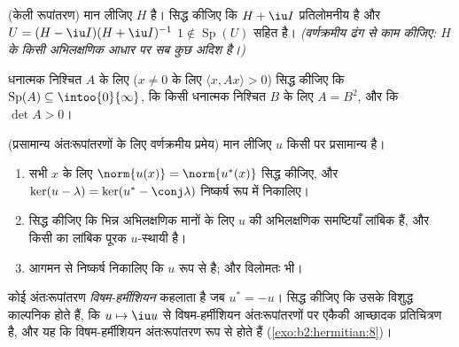 \begin{exercise}[$\star\star$]\label{exo:b2:hermitian:6}
(केली रूपांतरण) मान लीजिए $H$  है। सिद्ध कीजिए कि $H + \iu I$
प्रतिलोमनीय है और $U = (H - \iu I)(H + \iu I)^{-1}$ $1 \notin \operatorname{Sp}(U)$ सहित  है। \emph{(वर्णक्रमीय ढंग से काम
कीजिए: $H$ के किसी अभिलक्षणिक आधार पर सब कुछ अदिश है।)}
\end{exercise}

\begin{exercise}[$\star\star$]\label{exo:b2:hermitian:7}
 धनात्मक निश्चित $A$ के लिए ($x \neq 0$ के लिए $\langle x, Ax\rangle > 0$) सिद्ध कीजिए कि $\operatorname{Sp}(A) \subseteq
\intoo{0}{\infty}$,
कि किसी  धनात्मक निश्चित $B$ के लिए $A = B^2$, और कि $\det A > 0$।
\end{exercise}

\begin{exercise}[$\star\star\star$]\label{exo:b2:hermitian:8}
(प्रसामान्य अंतःरूपांतरणों के लिए वर्णक्रमीय प्रमेय) मान लीजिए $u$ किसी
 पर प्रसामान्य है।
\begin{enumerate}
  \item सभी $x$ के लिए $\norm{u(x)} = \norm{u^*(x)}$ सिद्ध कीजिए, और $\ker(u - \lambda) = \ker(u^* - \conj\lambda)$ निष्कर्ष रूप में निकालिए।
  \item सिद्ध कीजिए कि भिन्न अभिलक्षणिक मानों के लिए $u$ की अभिलक्षणिक
        समष्टियाँ लांबिक हैं, और किसी  का लांबिक पूरक
        $u$-स्थायी है।
  \item आगमन से निष्कर्ष निकालिए कि $u$  रूप से  है; और
        विलोमतः भी।
\end{enumerate}
\end{exercise}

\begin{exercise}[$\star$]\label{exo:b2:hermitian:9}
कोई अंतःरूपांतरण \emph{विषम-हर्मीशियन} कहलाता है जब $u^* = -u$। सिद्ध कीजिए कि
उसके  विशुद्ध काल्पनिक होते हैं, कि $u \mapsto \iu
u$  से
विषम-हर्मीशियन अंतःरूपांतरणों पर एकैकी आच्छादक प्रतिचित्रण है, और यह कि
विषम-हर्मीशियन अंतःरूपांतरण  रूप से  होते हैं (\cref{exo:b2:hermitian:8})।
\end{exercise}

